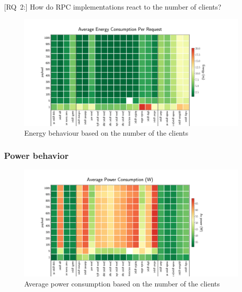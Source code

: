 [\textsc{RQ}~2:] How do RPC implementations react to the number of clients?
\begin{figure}[!hbt]
    \begin{center}
        \includegraphics[width=1.2\linewidth]{imgs/energy_cost_clients}
    \end{center}
    \caption{Energy behaviour based on the number of the clients}\label{fig:rpcproenergy_cost_clients}
\end{figure}

\subsubsection{Power behavior}

\begin{figure}[!hbt]
    \begin{center}
        \includegraphics[width=1.2\linewidth]{imgs/power_consumption_clients}
    \end{center}
    \caption{Average power consumption based on the number of the clients}\label{fig:power_consumption_clients}
\end{figure}

